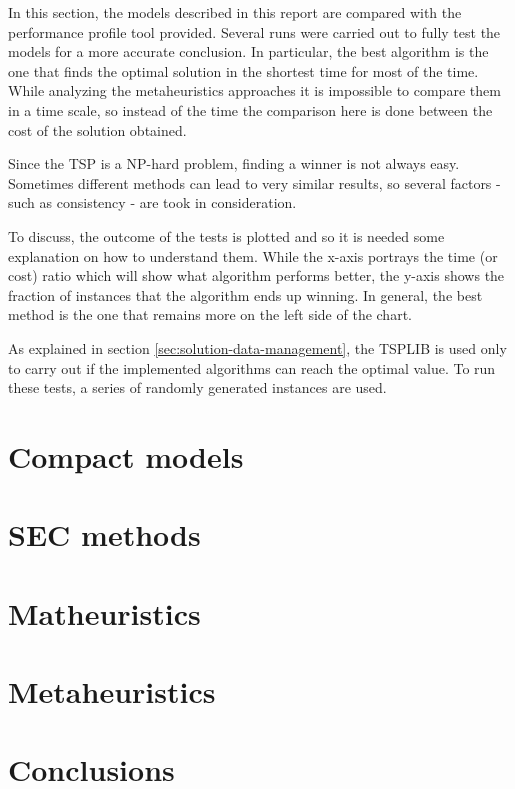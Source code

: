 In this section, the models described in this report are compared with the performance profile tool provided. Several runs were carried out to fully test the models for a more accurate conclusion. In particular, the best algorithm is the one that finds the optimal solution in the shortest time for most of the time. While analyzing the metaheuristics approaches it is impossible to compare them in a time scale, so instead of the time the comparison here is done between the cost of the solution obtained.

Since the TSP is a NP-hard problem, finding a winner is not always easy. Sometimes different methods can lead to very similar results, so several factors - such as consistency - are took in consideration.

To discuss, the outcome of the tests is plotted and so it is needed some explanation on how to understand them. While the x-axis portrays the time (or cost) ratio which will show what algorithm performs better, the y-axis shows the fraction of instances that the algorithm ends up winning. In general, the best method is the one that remains more on the left side of the chart.

As explained in section \ref{sec:solution-data-management}, the TSPLIB is used only to carry out if the implemented algorithms can reach the optimal value. To run these tests, a series of randomly generated instances are used.

\section{Compact models}
\label{sec:results-compact}


\section{SEC methods}
\label{sec:results-sec}


\section{Matheuristics}
\label{sec:results-math}


\section{Metaheuristics}
\label{sec:results-heur}


\section{Conclusions}
\label{sec:conclusions}
